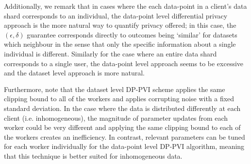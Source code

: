 Additionally, we remark that in cases where the each data-point in a client's data shard corresponds to an individual, the data-point level differential privacy approach is the more natural way to quantify privacy offered; in this case, the $(\epsilon, \delta)$ guarantee corresponds directly to outcomes being `similar' for datasets which neighbour in the sense that only the specific information about a single individual is different. Similarly for the case where an entire data shard corresponds to a single user, the data-point level approach seems to be excessive and the dataset level approach is more natural. 

Furthermore, note that the dataset level DP-PVI scheme applies the same clipping bound to all of the workers and applies corrupting noise with a fixed standard deviation. In the case where the data is distributed differently at each client (i.e. inhomogeneous), the magnitude of parameter updates from each worker could be very different and applying the same clipping bound to each of the workers creates an inefficiency. In contrast, relevant parameters can be tuned for each worker individually for the data-point level DP-PVI algorithm, meaning that this technique is better suited for inhomogeneous data.
